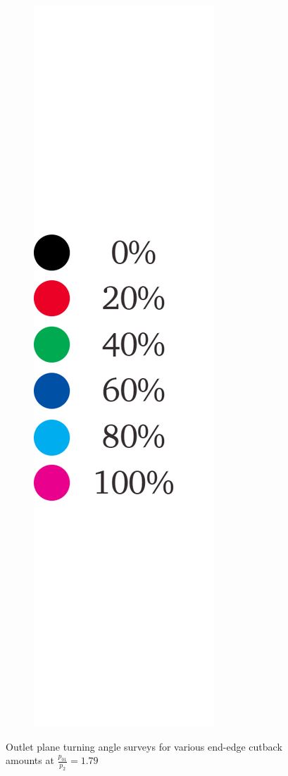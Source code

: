 \documentclass[a4paper, 11pt, oneside]{report}
\begin{document}
\begin{figure}[H]
\begin{subfigure}{.1125\textwidth}
		\includegraphics[width=\linewidth]{figs/ss_cutbacks_vs_capacities_trends_legend_ver02.png}
	\end{subfigure}
	\caption{Outlet plane turning angle surveys for various end-edge cutback amounts at $\frac{p_{01}}{p_2}=1.79$}
      \label{fig:ss_cutbacks_turning_angle_surveys}
\end{figure}
\end{document}
